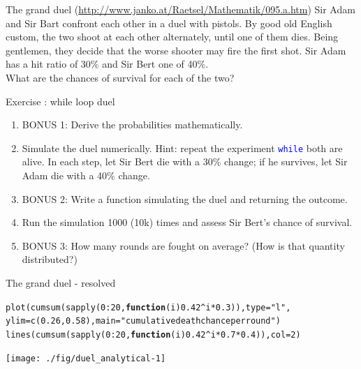 \documentclass[xcolor=table,       handout,    xcolor=dvipsnames]{beamer}\usepackage[]{graphicx}\usepackage[]{color}
\makeatletter
\newcommand{\hlnum}[1]{\textcolor[rgb]{0,0,0}{#1}}
\newcommand{\hlstr}[1]{\textcolor[rgb]{0.545,0.137,0.137}{#1}}
\newcommand{\hlopt}[1]{\textcolor[rgb]{0,0,0}{#1}}
\newcommand{\hlstd}[1]{\textcolor[rgb]{0,0,0}{#1}}
\newcommand{\hlkwa}[1]{\textcolor[rgb]{1,0,0}{\textbf{#1}}}
\newcommand{\hlkwc}[1]{\textcolor[rgb]{1,0,1}{#1}}
\newcommand{\hlkwd}[1]{\textcolor[rgb]{0,0,1}{#1}}
\newenvironment{kframe}{%
 \def\at@end@of@kframe{}%
 \ifinner\ifhmode%
  \def\at@end@of@kframe{\end{minipage}}%
  \begin{minipage}{\columnwidth}%
 \fi\fi%
 \def\FrameCommand##1{\hskip\@totalleftmargin \hskip-\fboxsep
 \colorbox{shadecolor}{##1}\hskip-\fboxsep
     \hskip-\linewidth \hskip-\@totalleftmargin \hskip\columnwidth}%
 \MakeFramed {\advance\hsize-\width
   \@totalleftmargin\z@ \linewidth\hsize
   \@setminipage}}%
 {\par\unskip\endMakeFramed%
 \at@end@of@kframe}
\newenvironment{knitrout}{}{} %
\newcounter{exercisecount}
\newenvironment{exercise}[1]
{%
\stepcounter{exercisecount}
\begin{block}{Exercise \arabic{exercisecount}: #1}
}
{%
\end{block} }
\newcommand{\rcode}[1]{\texttt{\textcolor{Blue}{#1}}} %
\makeatother
\begin{document}
\begin{frame}[fragile]{The grand duel {\scriptsize (\url{http://www.janko.at/Raetsel/Mathematik/095.a.htm})}}
Sir Adam and Sir Bart confront each other in a duel with pistols.
By good old English custom, the two shoot at each other alternately, until one of them dies.
Being gentlemen, they decide that the worse shooter may fire the first shot.
Sir Adam has a hit ratio of 30\% and Sir Bert one of 40\%.\\
What are the chances of survival for each of the two?\\
\small
\begin{exercise}{while loop duel}
\begin{enumerate}
\item BONUS 1: Derive the probabilities mathematically.
\item Simulate the duel numerically. Hint: repeat the experiment \rcode{while} both are alive. In each step, let Sir Bert die with a 30\% change; if he survives, let Sir Adam die with a 40\% change.
\item BONUS 2: Write a function simulating the duel and returning the outcome.
\item Run the simulation 1000 (10k) times and assess Sir Bert's chance of survival.
\item BONUS 3: How many rounds are fought on average? (How is that quantity distributed?)
\end{enumerate}
\end{exercise}
\normalsize
\end{frame}


\begin{frame}[fragile]{The grand duel - resolved}
\begin{knitrout}\small
{}\color{fgcolor}\begin{kframe}
\begin{alltt}
\hlkwd{plot}\hlstd{(}\hlkwd{cumsum}\hlstd{(}\hlkwd{sapply}\hlstd{(}\hlnum{0}\hlopt{:}\hlnum{20}\hlstd{,} \hlkwa{function}\hlstd{(}\hlkwc{i}\hlstd{)} \hlnum{0.42}\hlopt{^}\hlstd{i}\hlopt{*}\hlnum{0.3}\hlstd{)),} \hlkwc{type}\hlstd{=}\hlstr{"l"}\hlstd{,}
     \hlkwc{ylim}\hlstd{=}\hlkwd{c}\hlstd{(}\hlnum{0.26}\hlstd{,}\hlnum{0.58}\hlstd{),} \hlkwc{main}\hlstd{=}\hlstr{"cumulative death chance per round"}\hlstd{)}
\hlkwd{lines}\hlstd{(}\hlkwd{cumsum}\hlstd{(}\hlkwd{sapply}\hlstd{(}\hlnum{0}\hlopt{:}\hlnum{20}\hlstd{,} \hlkwa{function}\hlstd{(}\hlkwc{i}\hlstd{)} \hlnum{0.42}\hlopt{^}\hlstd{i}\hlopt{*}\hlnum{0.7}\hlopt{*}\hlnum{0.4}\hlstd{)),} \hlkwc{col}\hlstd{=}\hlnum{2}\hlstd{)}
\end{alltt}
\end{kframe}

{\centering \texttt{[image: ./fig/duel\_analytical-1]} 

}



\end{knitrout}
\end{frame}
\end{document}
